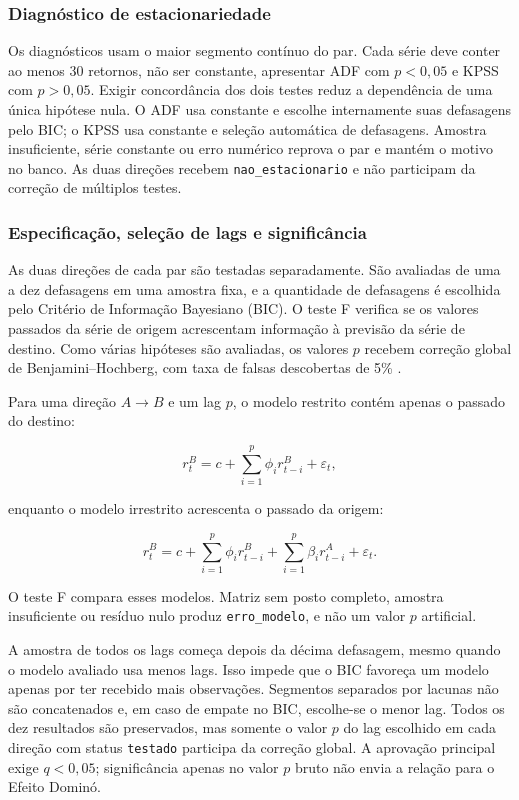 \documentclass[12pt,a4paper]{article}
\begin{document}
\subsubsection{Diagnóstico de estacionariedade}

Os diagnósticos usam o maior segmento contínuo do par. Cada série deve conter
ao menos 30 retornos, não ser constante, apresentar ADF com $p<0{,}05$ e KPSS
com $p>0{,}05$. Exigir concordância dos dois testes reduz a dependência de uma
única hipótese nula. O ADF usa constante e escolhe internamente suas defasagens
pelo BIC; o KPSS usa constante e seleção automática de defasagens. Amostra
insuficiente, série constante ou erro numérico reprova o par e mantém o motivo
no banco. As duas direções recebem \texttt{nao\_estacionario} e não participam
da correção de múltiplos testes.

\subsubsection{Especificação, seleção de lags e significância}

As duas direções de cada par são testadas separadamente. São avaliadas de uma a
dez defasagens em uma amostra fixa, e a quantidade de defasagens é escolhida
pelo Critério de Informação Bayesiano (BIC). O teste F verifica se os valores
passados da série de origem acrescentam informação à previsão da série de
destino. Como várias hipóteses são avaliadas, os valores $p$ recebem correção
global de Benjamini--Hochberg, com taxa de falsas descobertas de 5\%
\cite{benjamini1995}.

Para uma direção $A \rightarrow B$ e um lag $p$, o modelo restrito contém
apenas o passado do destino:

\begin{equation}
    r^{B}_{t} = c + \sum_{i=1}^{p}\phi_i r^{B}_{t-i} + \varepsilon_t,
\end{equation}

\noindent enquanto o modelo irrestrito acrescenta o passado da origem:

\begin{equation}
    r^{B}_{t} = c + \sum_{i=1}^{p}\phi_i r^{B}_{t-i}
    + \sum_{i=1}^{p}\beta_i r^{A}_{t-i} + \varepsilon_t.
\end{equation}

O teste F compara esses modelos. Matriz sem posto completo, amostra insuficiente
ou resíduo nulo produz \texttt{erro\_modelo}, e não um valor $p$ artificial.

A amostra de todos os lags começa depois da décima defasagem, mesmo quando o
modelo avaliado usa menos lags. Isso impede que o BIC favoreça um modelo apenas
por ter recebido mais observações. Segmentos separados por lacunas não são
concatenados e, em caso de empate no BIC, escolhe-se o menor lag. Todos os dez
resultados são preservados, mas somente o valor $p$ do lag escolhido em cada
direção com status \texttt{testado} participa da correção global. A aprovação
principal exige $q<0{,}05$; significância apenas no valor $p$ bruto não envia a
relação para o Efeito Dominó.
\end{document}
